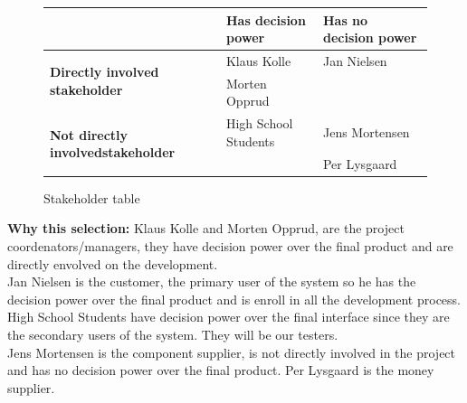 \begin{figure}[h!]
 \begin{center}
  \begin{tabular}{| l | l | l |}
   \hline
    & \textbf{Has decision power} & \textbf{Has no decision power} \\ \hline
    \multirow{2}{*}{\textbf{Directly involved stakeholder}} 
    	& Klaus Kolle & Jan Nielsen \\ 
    	& Morten Opprud &  \\ \hline
    \multirow{2}{*}{\textbf{Not directly involvedstakeholder}} 
    	& High School Students & Jens Mortensen\\ 
    	& & Per Lysgaard\\ \hline
   \end{tabular}
  \end{center}
 \caption{Stakeholder table}
\end{figure}

\textbf{Why this selection: } \newline
Klaus Kolle and Morten Opprud, are the project coordenators/managers, they
have decision power over the final product and are directly envolved on the
development.\\
\newline
Jan Nielsen is the customer, the primary user of the system so he has the
decision power over the final product and is enroll in all the development
process.\\
\newline
High School Students have decision power over the final interface since they
are the secondary users of the system. They will be our testers.\\
\newline
Jens Mortensen is the component supplier, is not directly involved in the
project and has no decision power over the final product.
\newline
Per Lysgaard is the money supplier.
\newline
\newpage

